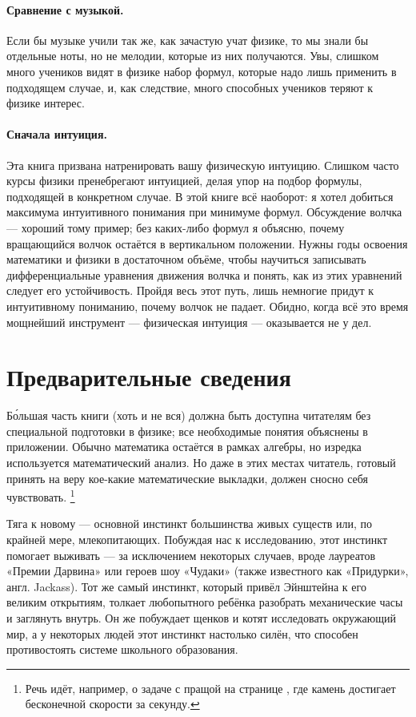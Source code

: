 \paragraph{Сравнение с музыкой.}
Если бы музыке учили так же, как зачастую учат физике, то мы знали бы отдельные ноты, но не мелодии, которые из них получаются.
Увы, слишком много учеников видят в физике набор формул, которые надо лишь применить в подходящем случае, и,
как следствие, много способных учеников теряют к физике интерес.

\paragraph{Сначала интуиция.}
Эта книга призвана натренировать вашу физическую интуицию.
Слишком часто курсы физики пренебрегают интуицией, делая упор на подбор формулы, подходящей в конкретном случае.
В этой книге всё наоборот:
я хотел добиться максимума интуитивного понимания при минимуме формул.
Обсуждение волчка --- хороший тому пример;
без каких-либо формул я объясню, почему вращающийся волчок остаётся в вертикальном положении.
Нужны годы освоения математики и физики в достаточном объёме, чтобы научиться записывать дифференциальные уравнения движения волчка и понять, как из этих уравнений следует его устойчивость.
Пройдя весь этот путь, лишь немногие придут к интуитивному пониманию, почему волчок не падает.
Обидно, когда всё это время мощнейший инструмент --- физическая интуиция --- оказывается не у дел.

\section{Предварительные сведения}

Б\'{о}льшая часть книги (хоть и не вся) должна быть доступна читателям без специальной подготовки в физике;
все необходимые понятия объяснены в приложении.
Обычно математика остаётся в рамках алгебры, но изредка используется математический анализ.
Но даже в этих местах читатель, готовый принять на веру кое-какие математические выкладки, должен сносно себя чувствовать.%
\footnote{Речь идёт, например, о задаче с пращой на странице \pageref{Задача Давида и Голиафа}, где камень достигает бесконечной скорости за секунду.}

Тяга к новому — основной инстинкт большинства живых существ или, по крайней мере, млекопитающих.
Побуждая нас к исследованию, этот инстинкт помогает выживать — за исключением некоторых случаев, вроде лауреатов «Премии Дарвина» или героев шоу «Чудаки» (также известного как «Придурки», англ. Jackass).
Тот же самый инстинкт, который привёл Эйнштейна к его великим открытиям, толкает любопытного ребёнка разобрать механические часы и заглянуть внутрь.
Он же побуждает щенков и котят исследовать окружающий мир,
а у некоторых людей этот инстинкт настолько силён, что способен противостоять системе школьного образования.

